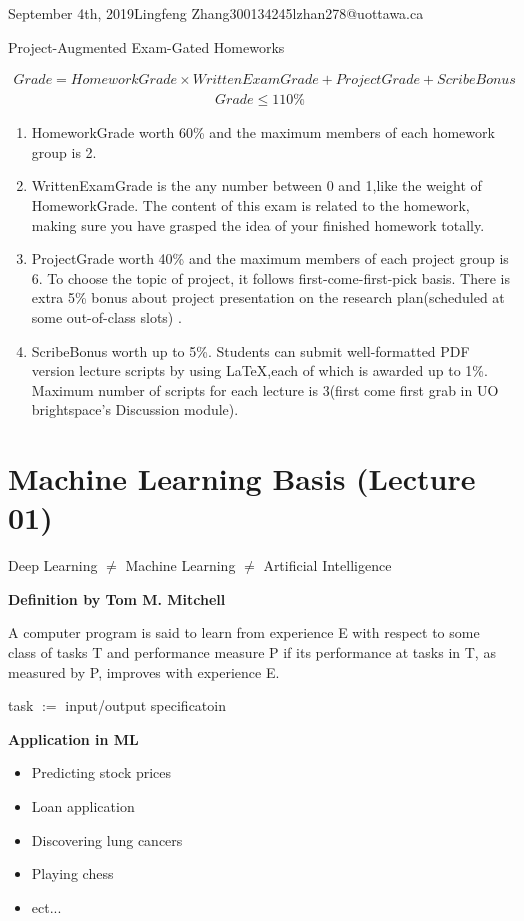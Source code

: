 \documentclass{article}
\begin{document}
\begin{lecture}{September 4th, 2019}{Lingfeng Zhang}{300134245}{lzhan278@uottawa.ca}
\begin{itemize}
\begin{center}Project-Augmented Exam-Gated Homeworks\end{center}
\begin{eqnarray}
Grade = HomeworkGrade\times WrittenExamGrade+ProjectGrade+ScribeBonus\end{eqnarray}
\begin{eqnarray}
Grade  \leqslant 110\%
\end{eqnarray}
\end{itemize} 

\begin{enumerate}
\item HomeworkGrade worth  60\% and the maximum members of each homework group is 2.
\item WrittenExamGrade is the any number between 0 and 1,like the weight of HomeworkGrade. The content of this  exam is related to the homework, making sure you have grasped the idea of your finished homework totally.
\item ProjectGrade worth 40\% and the maximum members of each project group is 6. To choose the topic of project, it follows first-come-first-pick basis. There is extra 5\% bonus about project presentation on the research plan(scheduled at some out-of-class slots) .
\item ScribeBonus worth up to 5\%. Students can submit well-formatted PDF version lecture scripts by using \LaTeX ,each of which is awarded up to 1\%. Maximum number of scripts for each lecture is 3(first come first grab in UO brightspace's Discussion module).
\end{enumerate}


\section{Machine Learning Basis (Lecture 01)}

Deep Learning $\neq$ Machine Learning $\neq$  Artificial Intelligence

\textbf{Definition by Tom M. Mitchell}
\begin{displayquote}A computer program is said to learn from experience E with respect to some class of tasks T and performance measure P if its performance at tasks in T, as measured by P, improves with experience E.
\end{displayquote}

task $:=$ input/output specificatoin

\textbf{Application in ML}
\begin{itemize}
\item Predicting stock prices
\item Loan application
\item Discovering lung cancers
\item Playing chess
\item ect... 
\end{itemize}


\end{lecture}
\end{document}
